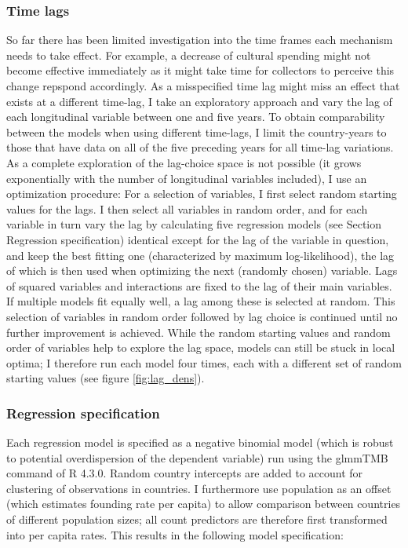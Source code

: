 \documentclass[11pt]{article}
\begin{document}
\subsubsection*{Time lags}

So far there has been limited investigation into the time frames each mechanism needs to take effect.
For example, a decrease of cultural spending might not become effective immediately as it might take time for collectors to perceive this change repspond accordingly.
As a misspecified time lag might miss an effect that exists at a different time-lag, I take an exploratory approach and vary the lag of each longitudinal variable between one and five years.
To obtain comparability between the models when using different time-lags, I limit the country-years to those that have data on all of the five preceding years for all time-lag variations.
As a complete exploration of the lag-choice space is not possible (it grows exponentially with the number of longitudinal variables included), I use an optimization procedure:
For a selection of variables, I first select random starting values for the lags.
I then select all variables in random order, and for each variable in turn vary the lag by calculating five regression models (see Section Regression specification) identical except for the lag of the variable in question, and keep the best fitting one (characterized by maximum log-likelihood), the lag of which is then used when optimizing the next (randomly chosen) variable.
Lags of squared variables and interactions are fixed to the lag of their main variables.
If multiple models fit equally well, a lag among these is selected at random.
This selection of variables in random order followed by lag choice is continued until no further improvement is achieved.
While the random starting values and random order of variables help to explore the lag space, models can still be stuck in local optima; I therefore run each model four times, each with a different set of random starting values (see figure \ref{fig:lag_dens}). 



\subsubsection*{Regression specification}

Each regression model is specified as a negative binomial model (which is robust to potential overdispersion of the dependent variable) run using the glmmTMB command \parencite{Brooks_etal_2017_glmmTMB} of R 4.3.0. 
Random country intercepts are added to account for clustering of observations in countries.
I furthermore use population as an offset (which estimates founding rate per capita) to allow comparison between countries of different population sizes; all count predictors are therefore first transformed into per capita rates.
This results in the following model specification:
\end{document}
